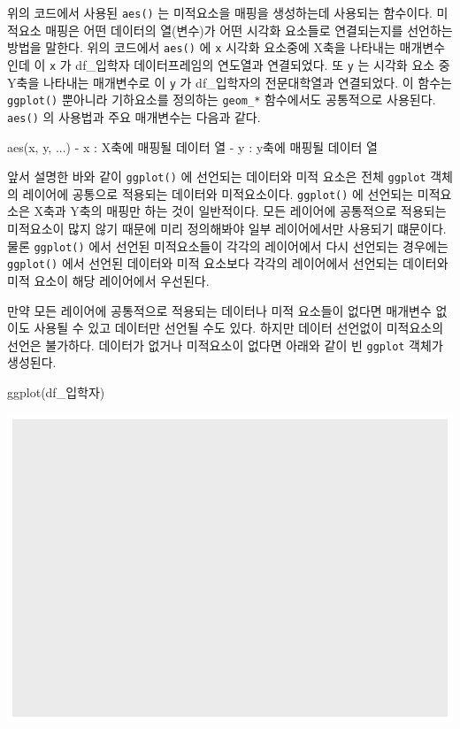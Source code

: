 \documentclass[
]{article}
\newenvironment{Shaded}{\begin{snugshade}}{\end{snugshade}}
\newcommand{\FunctionTok}[1]{\textcolor[rgb]{0.00,0.00,0.00}{#1}}
\newcommand{\NormalTok}[1]{#1}
\newcommand{\SpecialCharTok}[1]{\textcolor[rgb]{0.00,0.00,0.00}{#1}}
\begin{document}
위의 코드에서 사용된 \texttt{aes()} 는 미적요소을 매핑을 생성하는데 사용되는 함수이다. 미적요소 매핑은 어떤 데이터의 열(변수)가 어떤 시각화 요소들로 연결되는지를 선언하는 방법을 말한다. 위의 코드에서 \texttt{aes()} 에 \texttt{x} 시각화 요소중에 X축을 나타내는 매개변수인데 이 \texttt{x} 가 df\_입학자 데이터프레임의 연도열과 연결되었다. 또 \texttt{y} 는 시각화 요소 중 Y축을 나타내는 매개변수로 이 \texttt{y} 가 df\_입학자의 전문대학열과 연결되었다. 이 함수는 \texttt{ggplot()} 뿐아니라 기하요소를 정의하는 \texttt{geom\_*} 함수에서도 공통적으로 사용된다. \texttt{aes()} 의 사용법과 주요 매개변수는 다음과 같다.

\begin{Shaded}
\begin{Highlighting}[]
\FunctionTok{aes}\NormalTok{(x, y, ...)}
  \SpecialCharTok{{-}}\NormalTok{ x }\SpecialCharTok{:}\NormalTok{ X축에 매핑될 데이터 열}
  \SpecialCharTok{{-}}\NormalTok{ y }\SpecialCharTok{:}\NormalTok{ y축에 매핑될 데이터 열}
\end{Highlighting}
\end{Shaded}

앞서 설명한 바와 같이 \texttt{ggplot()} 에 선언되는 데이터와 미적 요소은 전체 \texttt{ggplot} 객체의 레이어에 공통으로 적용되는 데이터와 미적요소이다. \texttt{ggplot()} 에 선언되는 미적요소은 X축과 Y축의 매핑만 하는 것이 일반적이다. 모든 레이어에 공통적으로 적용되는 미적요소이 많지 않기 때문에 미리 정의해봐야 일부 레이어에서만 사용되기 떄문이다. 물론 \texttt{ggplot()} 에서 선언된 미적요소들이 각각의 레이어에서 다시 선언되는 경우에는 \texttt{ggplot()} 에서 선언된 데이터와 미적 요소보다 각각의 레이어에서 선언되는 데이터와 미적 요소이 해당 레이어에서 우선된다.

만약 모든 레이어에 공통적으로 적용되는 데이터나 미적 요소들이 없다면 매개변수 없이도 사용될 수 있고 데이터만 선언될 수도 있다. 하지만 데이터 선언없이 미적요소의 선언은 불가하다. 데이터가 없거나 미적요소이 없다면 아래와 같이 빈 \texttt{ggplot} 객체가 생성된다.

\begin{Shaded}
\begin{Highlighting}[]
\FunctionTok{ggplot}\NormalTok{(df\_입학자)}
\end{Highlighting}
\end{Shaded}

\includegraphics{chap3_files/figure-latex/unnamed-chunk-5-1.pdf}
\end{document}
